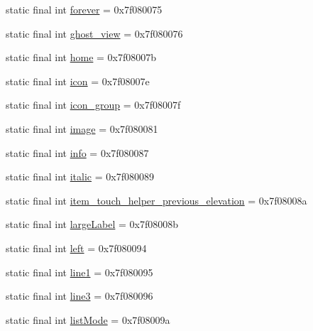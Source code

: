 \begin{DoxyCompactItemize}
\item 
static final int \mbox{\hyperlink{classandroid_1_1support_1_1design_1_1_r_1_1id_a6ec90276f3cf057a0cabcd22b4b4eb6a}{forever}} = 0x7f080075
\item 
static final int \mbox{\hyperlink{classandroid_1_1support_1_1design_1_1_r_1_1id_a41295642e91c7262875f7914b5ce240e}{ghost\+\_\+view}} = 0x7f080076
\item 
static final int \mbox{\hyperlink{classandroid_1_1support_1_1design_1_1_r_1_1id_a848c27a28b62431c2fc8e4bb50cf204c}{home}} = 0x7f08007b
\item 
static final int \mbox{\hyperlink{classandroid_1_1support_1_1design_1_1_r_1_1id_a62494a5c59714ce0338e2e5c84665d65}{icon}} = 0x7f08007e
\item 
static final int \mbox{\hyperlink{classandroid_1_1support_1_1design_1_1_r_1_1id_a19ea57e4b9ba2101c5f99dee6763cdd0}{icon\+\_\+group}} = 0x7f08007f
\item 
static final int \mbox{\hyperlink{classandroid_1_1support_1_1design_1_1_r_1_1id_ae3ec7e2d3cf3a673e1479e9f39e25716}{image}} = 0x7f080081
\item 
static final int \mbox{\hyperlink{classandroid_1_1support_1_1design_1_1_r_1_1id_a835f9da94449c6b2e273b1da9a0bbd69}{info}} = 0x7f080087
\item 
static final int \mbox{\hyperlink{classandroid_1_1support_1_1design_1_1_r_1_1id_a3d66f561d244a5c64e8a7e8bc61a4e7a}{italic}} = 0x7f080089
\item 
static final int \mbox{\hyperlink{classandroid_1_1support_1_1design_1_1_r_1_1id_ace7c90a7a591a13a8cc5e969c821e08d}{item\+\_\+touch\+\_\+helper\+\_\+previous\+\_\+elevation}} = 0x7f08008a
\item 
static final int \mbox{\hyperlink{classandroid_1_1support_1_1design_1_1_r_1_1id_afd366da5bef3835c481c8caeaae9f216}{large\+Label}} = 0x7f08008b
\item 
static final int \mbox{\hyperlink{classandroid_1_1support_1_1design_1_1_r_1_1id_a81624ba2a9b9f8858709fbac6452ce42}{left}} = 0x7f080094
\item 
static final int \mbox{\hyperlink{classandroid_1_1support_1_1design_1_1_r_1_1id_a4ca979dfdfa159de3380dc7366d4475a}{line1}} = 0x7f080095
\item 
static final int \mbox{\hyperlink{classandroid_1_1support_1_1design_1_1_r_1_1id_adb2c99c7cb5b12eb153c76aca66ae2c2}{line3}} = 0x7f080096
\item 
static final int \mbox{\hyperlink{classandroid_1_1support_1_1design_1_1_r_1_1id_a7b5a48e1774d54084d1294b471209727}{list\+Mode}} = 0x7f08009a

\end{DoxyCompactItemize}
